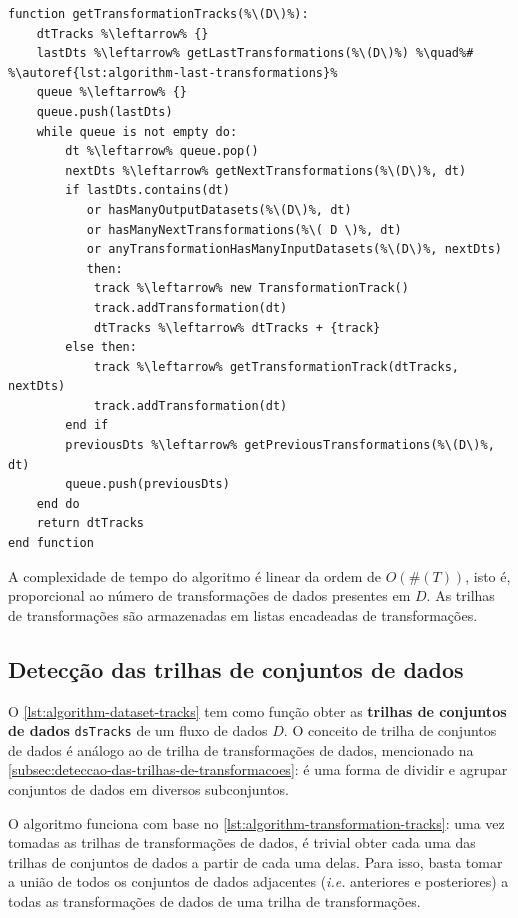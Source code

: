 \begin{minipage}[c]{0.95\textwidth}
\begin{lstlisting}[language=pseudocode,label={lst:algorithm-transformation-tracks},caption={[Detecção das trilhas de transformações]Detecção do rastro do fluxo de dados no nível de trilhas de transformações.}]
function getTransformationTracks(%\(D\)%):
    dtTracks %\leftarrow% {}
    lastDts %\leftarrow% getLastTransformations(%\(D\)%) %\quad%# %\autoref{lst:algorithm-last-transformations}%
    queue %\leftarrow% {}
    queue.push(lastDts)
    while queue is not empty do:
        dt %\leftarrow% queue.pop()
        nextDts %\leftarrow% getNextTransformations(%\(D\)%, dt)
        if lastDts.contains(dt)
           or hasManyOutputDatasets(%\(D\)%, dt)
           or hasManyNextTransformations(%\( D \)%, dt)
           or anyTransformationHasManyInputDatasets(%\(D\)%, nextDts)
           then:
            track %\leftarrow% new TransformationTrack()
            track.addTransformation(dt)
            dtTracks %\leftarrow% dtTracks + {track}
        else then:
            track %\leftarrow% getTransformationTrack(dtTracks, nextDts)
            track.addTransformation(dt)
        end if
        previousDts %\leftarrow% getPreviousTransformations(%\(D\)%, dt)
        queue.push(previousDts)
    end do
    return dtTracks
end function
\end{lstlisting}
\end{minipage}

A complexidade de tempo do algoritmo é linear da ordem de \( O(\#(T)) \), isto é, proporcional ao número de transformações de dados presentes em \( D \). As trilhas de transformações são armazenadas em listas encadeadas de transformações.

\subsection{Detecção das trilhas de conjuntos de dados}

O \autoref{lst:algorithm-dataset-tracks} tem como função obter as \textbf{trilhas de conjuntos de dados} \texttt{dsTracks} de um fluxo de dados \( D \). O conceito de trilha de conjuntos de dados é análogo ao de trilha de transformações de dados, mencionado na \autoref{subsec:deteccao-das-trilhas-de-transformacoes}: é uma forma de dividir e agrupar conjuntos de dados em diversos subconjuntos.

O algoritmo funciona com base no \autoref{lst:algorithm-transformation-tracks}: uma vez tomadas as trilhas de transformações de dados, é trivial obter cada uma das trilhas de conjuntos de dados a partir de cada uma delas. Para isso, basta tomar a união de todos os conjuntos de dados adjacentes (\textit{i.e.} anteriores e posteriores) a todas as transformações de dados de uma trilha de transformações.

